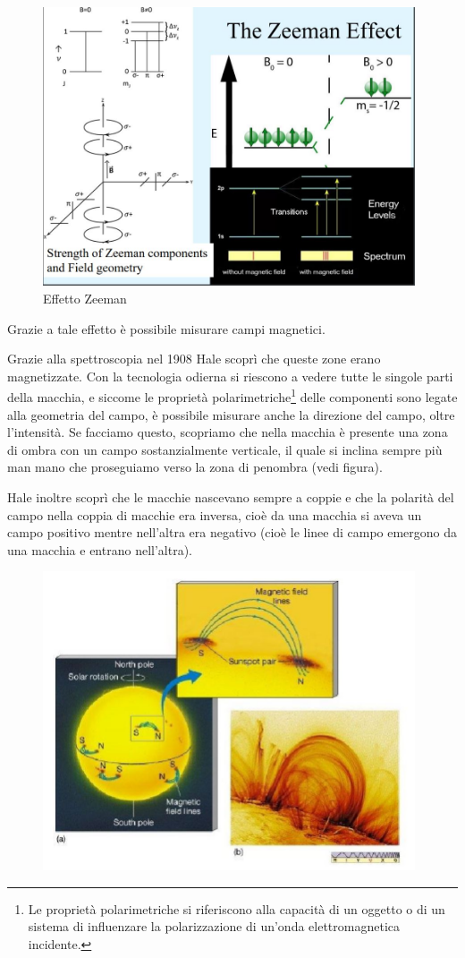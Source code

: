 \begin{figure}[H]
    \centering
    \includegraphics[width=11cm]{2dic/Effetto_Zeeman.jpg}
    \caption{Effetto Zeeman}
    \label{fig:Zeeman}
\end{figure}

Grazie a tale effetto è possibile misurare campi magnetici.

Grazie alla spettroscopia nel 1908 Hale scoprì che queste zone erano magnetizzate. Con la tecnologia odierna si riescono a vedere tutte le singole parti della macchia, e siccome le proprietà polarimetriche\footnote{Le proprietà polarimetriche si riferiscono alla capacità di un oggetto o di un sistema di influenzare la polarizzazione di un'onda elettromagnetica incidente.} delle componenti sono legate alla geometria del campo, è possibile misurare anche la direzione del campo, oltre l'intensità. Se facciamo questo, scopriamo che nella macchia è presente una zona di ombra con un campo sostanzialmente verticale, il quale si inclina sempre più man mano che proseguiamo verso la zona di penombra (vedi figura).

Hale inoltre scoprì che le macchie nascevano sempre a coppie e che la polarità del campo nella coppia di macchie era inversa, cioè da una macchia si aveva un campo positivo mentre nell'altra era negativo (cioè le linee di campo emergono da una macchia e entrano nell'altra).

\begin{figure}[H]
    \centering
    \includegraphics[width=11cm]{2dic/CampiMagneticiMacchie.jpg}
    \label{fig:CampoMag}
\end{figure}

